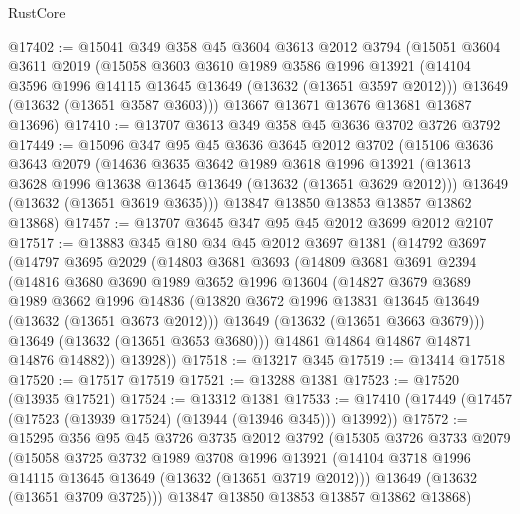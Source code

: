 \begin{lexlean}{RustCore}
\begin{coremodule}
@17402 := @15041
    @349
    @358
    @45
    @3604
    @3613
    @2012
    @3794
    (@15051
      @3604
      @3611
      @2019
      (@15058
        @3603
        @3610
        @1989
        @3586
        @1996
        @13921
        (@14104 @3596 @1996 @14115 @13645 @13649 (@13632 (@13651 @3597 @2012)))
        @13649
        (@13632 (@13651 @3587 @3603)))
      @13667
      @13671
      @13676
      @13681
      @13687
      @13696)
@17410 := @13707 @3613 @349 @358 @45 @3636 @3702 @3726 @3792
@17449 := @15096
    @347
    @95
    @45
    @3636
    @3645
    @2012
    @3702
    (@15106
      @3636
      @3643
      @2079
      (@14636
        @3635
        @3642
        @1989
        @3618
        @1996
        @13921
        (@13613 @3628 @1996 @13638 @13645 @13649 (@13632 (@13651 @3629 @2012)))
        @13649
        (@13632 (@13651 @3619 @3635)))
      @13847
      @13850
      @13853
      @13857
      @13862
      @13868)
@17457 := @13707 @3645 @347 @95 @45 @2012 @3699 @2012 @2107
@17517 := @13883
    @345
    @180
    @34
    @45
    @2012
    @3697
    @1381
    (@14792
      @3697
      (@14797
        @3695
        @2029
        (@14803
          @3681
          @3693
          (@14809
            @3681
            @3691
            @2394
            (@14816
              @3680
              @3690
              @1989
              @3652
              @1996
              @13604
              (@14827
                @3679
                @3689
                @1989
                @3662
                @1996
                @14836
                (@13820 @3672 @1996 @13831 @13645 @13649 (@13632 (@13651 @3673 @2012)))
                @13649
                (@13632 (@13651 @3663 @3679)))
              @13649
              (@13632 (@13651 @3653 @3680)))
            @14861
            @14864
            @14867
            @14871
            @14876
            @14882))
        @13928))
@17518 := @13217 @345
@17519 := @13414 @17518
@17520 := @17517 @17519
@17521 := @13288 @1381
@17523 := @17520 (@13935 @17521)
@17524 := @13312 @1381
@17533 := @17410 (@17449 (@17457 (@17523 (@13939 @17524) (@13944 (@13946 @345))) @13992))
@17572 := @15295
    @356
    @95
    @45
    @3726
    @3735
    @2012
    @3792
    (@15305
      @3726
      @3733
      @2079
      (@15058
        @3725
        @3732
        @1989
        @3708
        @1996
        @13921
        (@14104 @3718 @1996 @14115 @13645 @13649 (@13632 (@13651 @3719 @2012)))
        @13649
        (@13632 (@13651 @3709 @3725)))
      @13847
      @13850
      @13853
      @13857
      @13862
      @13868)

\end{coremodule}
\end{lexlean}
